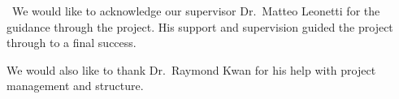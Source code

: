 \noindent\
We would like to acknowledge our supervisor Dr.\ Matteo Leonetti for the guidance
through the project. His support and supervision guided the project through to a
final success.

We would also like to thank Dr.\ Raymond Kwan for his help with project
management and structure.
